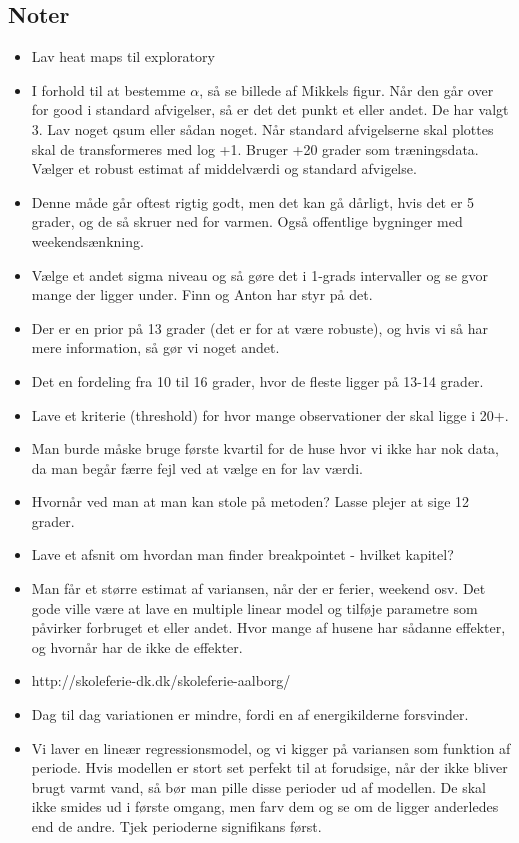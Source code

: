 \subsection{Noter}
\begin{itemize}
    \item Lav heat maps til exploratory
    \item I forhold til at bestemme $\alpha$, så se billede af Mikkels figur. Når den går over for good i standard afvigelser, så er det det punkt et eller andet. De har valgt 3. Lav noget qsum eller sådan noget. Når standard afvigelserne skal plottes skal de transformeres med log +1. Bruger +20 grader som træningsdata. Vælger et robust estimat af middelværdi og standard afvigelse. 
    \item Denne måde går oftest rigtig godt, men det kan gå dårligt, hvis det er 5 grader, og de så skruer ned for varmen. Også offentlige bygninger med weekendsænkning. 
    \item Vælge et andet sigma niveau og så gøre det i 1-grads intervaller og se gvor mange der ligger under. Finn og Anton har styr på det. 
    \item Der er en prior på 13 grader (det er for at være robuste), og hvis vi så har mere information, så gør vi noget andet. 
    \item Det en fordeling fra 10 til 16 grader, hvor de fleste ligger på 13-14 grader. 
    \item Lave et kriterie (threshold) for hvor mange observationer der skal ligge i 20+.  
    \item Man burde måske bruge første kvartil for de huse hvor vi ikke har nok data, da man begår færre fejl ved at vælge en for lav værdi. 
    \item Hvornår ved man at man kan stole på metoden? Lasse plejer at sige 12 grader. 
    \item Lave et afsnit om hvordan man finder breakpointet - hvilket kapitel? 
    \item Man får et større estimat af variansen, når der er ferier, weekend osv. Det gode ville være at lave en multiple linear model og tilføje parametre som påvirker forbruget et eller andet. Hvor mange af husene har sådanne effekter, og hvornår har de ikke de effekter. 
    \item http://skoleferie-dk.dk/skoleferie-aalborg/
    \item Dag til dag variationen er mindre, fordi en af energikilderne forsvinder. 
    \item Vi laver en lineær regressionsmodel, og vi kigger på variansen som funktion af periode. Hvis modellen er stort set perfekt til at forudsige, når der ikke bliver brugt varmt vand, så bør man pille disse perioder ud af modellen. De skal ikke smides ud i første omgang, men farv dem og se om de ligger anderledes end de andre. Tjek perioderne signifikans først. 

\end{itemize}
